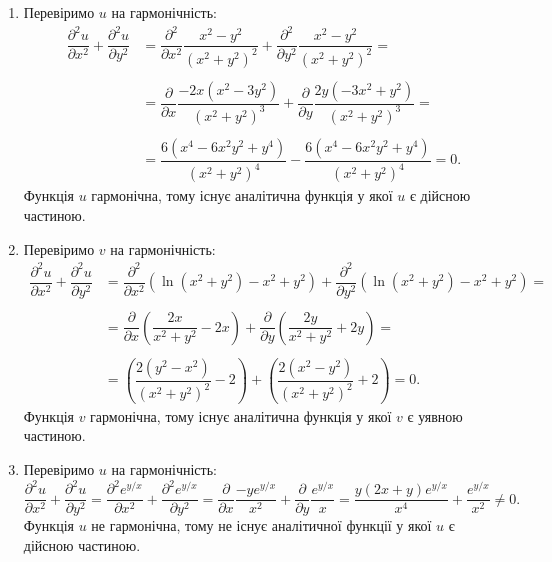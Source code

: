 \begin{solution}
    \begin{enumerate}
        \item Перевіримо $u$ на гармонічність:
        \begin{align*}
            \dfrac{\partial^2 u}{\partial x^2} + \dfrac{\partial^2 u}{\partial y^2} &= \dfrac{\partial^2}{\partial x^2} \dfrac{x^2 - y^2}{(x^2 + y^2)^2} + \dfrac{\partial^2}{\partial y^2} \dfrac{x^2 - y^2}{(x^2 + y^2)^2} = \\
            \\
            &= \dfrac{\partial}{\partial x} \dfrac{-2 x (x^2 - 3 y^2)}{(x^2 + y^2)^3} + \dfrac{\partial}{\partial y} \dfrac{2 y (-3 x^2 + y^2)}{(x^2 + y^2)^3} = \\
            \\
            &= \dfrac{6 (x^4 - 6 x^2 y^2 + y^4)}{(x^2 + y^2)^4} - \dfrac{6 (x^4 - 6 x^2 y^2 + y^4)}{(x^2 + y^2)^4} = 0.
        \end{align*}
        Функція $u$ гармонічна, тому існує аналітична функція у якої $u$ є дійсною частиною.
        \item Перевіримо $v$ на гармонічність:
        \begin{align*}
            \dfrac{\partial^2 u}{\partial x^2} + \dfrac{\partial^2 u}{\partial y^2} &= \dfrac{\partial^2}{\partial x^2} (\ln (x^2 + y^2) - x^2 + y^2) + \dfrac{\partial^2}{\partial y^2} (\ln (x^2 + y^2) - x^2 + y^2) = \\
            \\
            &= \dfrac{\partial}{\partial x} \left(\dfrac{2 x}{x^2 + y^2} - 2 x\right) + \dfrac{\partial}{\partial y} \left(\dfrac{2 y}{x^2 + y^2} + 2 y\right) = \\
            \\
            &= \left(\dfrac{2 (y^2 - x^2)}{(x^2 + y^2)^2} - 2\right) + \left(\dfrac{2 (x^2 - y^2)}{(x^2 + y^2)^2} + 2\right) = 0.
        \end{align*}
        Функція $v$ гармонічна, тому існує аналітична функція у якої $v$ є уявною частиною.
        \item Перевіримо $u$ на гармонічність:
        \[ \dfrac{\partial^2 u}{\partial x^2} + \dfrac{\partial^2 u}{\partial y^2} = \dfrac{\partial^2 e^{y / x}}{\partial x^2} + \dfrac{\partial^2 e^{y / x}}{\partial y^2} = \dfrac{\partial}{\partial x} \dfrac{-y e^{y / x}}{x^2} + \dfrac{\partial}{\partial y} \dfrac{e^{y / x}}{x} = \dfrac{y (2x + y) e^{y / x}}{x^4} + \dfrac{e^{y / x}}{x^2} \ne 0. \]
        Функція $u$ не гармонічна, тому не існує аналітичної функції у якої $u$ є дійсною частиною.
    \end{enumerate}
\end{solution}

